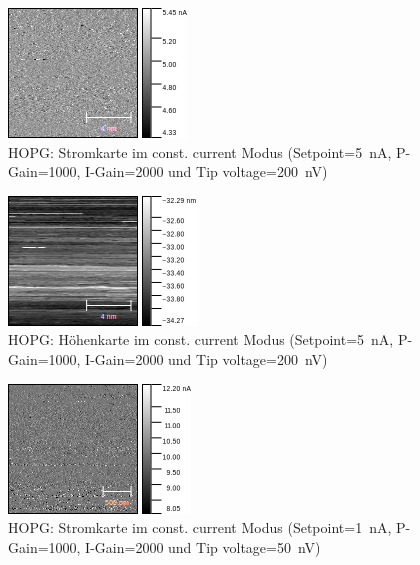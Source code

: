 \documentclass[sn-mathphys-num,iicol]{sn-jnl}
\theoremstyle{thmstyleone}
\theoremstyle{thmstyletwo}
\theoremstyle{thmstylethree}
\begin{document}
\begin{figure}[h]
        \centering
        \includegraphics[width=.5\textwidth]{../data/Graphit4_current.png}
        \caption{HOPG: Stromkarte im const. current Modus (Setpoint=\SI{5}{\nano A}, P-Gain=\SI{1000}{}, I-Gain=\SI{2000}{} und Tip voltage=\SI{200}{\nano V})} \label{fig:gr10nm200nVc}
\end{figure}
\begin{figure}[h]
        \centering
        \includegraphics[width=.5\textwidth]{../data/Graphit4_z.png}
        \caption{HOPG: Höhenkarte im const. current Modus (Setpoint=\SI{5}{\nano A}, P-Gain=\SI{1000}{}, I-Gain=\SI{2000}{} und Tip voltage=\SI{200}{\nano V})} \label{fig:gr10nm200nVz}
\end{figure}
\begin{figure}[h]
        \centering
        \includegraphics[width=.5\textwidth]{../data/Graphit5_current.png}
        \caption{HOPG: Stromkarte im const. current Modus (Setpoint=\SI{1}{\nano A}, P-Gain=\SI{1000}{}, I-Gain=\SI{2000}{} und Tip voltage=\SI{50}{\nano V})} \label{fig:gr2nm50nVc}
\end{figure}
\end{document}
